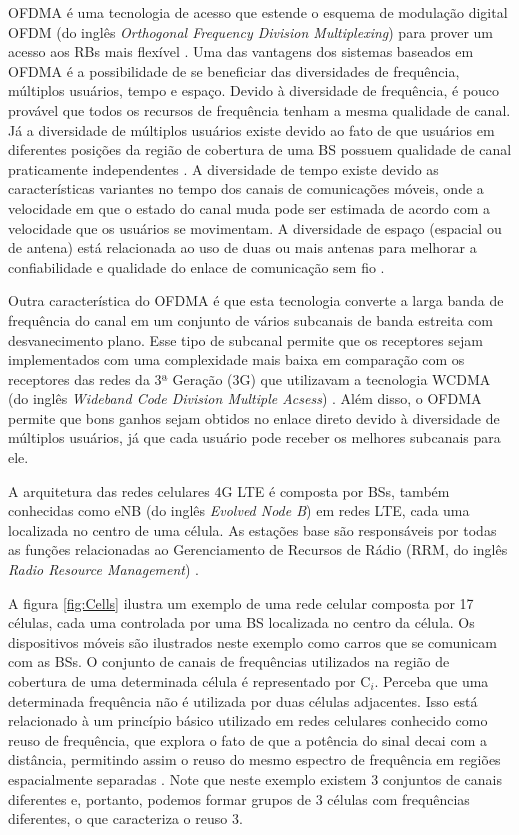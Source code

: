 \acs{OFDMA} é uma tecnologia de acesso que estende o esquema de modulação digital OFDM (do inglês \textit{Orthogonal Frequency Division Multiplexing}) para prover um acesso aos RBs mais flexível \cite{Nasralla2013}. Uma das vantagens dos sistemas baseados em \acs{OFDMA} é a possibilidade de se beneficiar das diversidades de frequência, múltiplos usuários, tempo e espaço. Devido à diversidade de frequência, é pouco provável que todos os recursos de frequência tenham a mesma qualidade de canal. Já a diversidade de múltiplos usuários existe devido ao fato de que usuários em diferentes posições da região de cobertura de uma BS possuem qualidade de canal praticamente independentes \cite{Lima2010}. A diversidade de tempo existe devido as características variantes no tempo dos canais de comunicações móveis, onde a velocidade em que o estado do canal muda pode ser estimada de acordo com a velocidade que os usuários se movimentam. A diversidade de espaço (espacial ou de antena) está relacionada ao uso de duas ou mais antenas para melhorar a confiabilidade e qualidade do enlace de comunicação sem fio \cite{Phd:Emanuel2011}.

Outra característica do \acs{OFDMA} é que esta tecnologia converte a larga banda de frequência do canal em um conjunto de vários subcanais de banda estreita com desvanecimento plano. Esse tipo de subcanal permite que os receptores sejam implementados com uma complexidade mais baixa em comparação com os receptores das redes da 3ª Geração (3G) que utilizavam a tecnologia WCDMA (do inglês \textit{Wideband Code Division Multiple Acsess}) \cite{EUSIPCO2009}. Além disso, o \acs{OFDMA} permite que bons ganhos sejam obtidos no enlace direto devido à diversidade de múltiplos usuários, já que cada usuário pode receber os melhores subcanais para ele.

A arquitetura das redes celulares 4G LTE é composta por BSs, também conhecidas como eNB (do inglês \textit{Evolved Node B}) em redes LTE, cada uma localizada no centro de uma célula. As estações base são responsáveis por todas as funções relacionadas ao Gerenciamento de Recursos de Rádio (RRM, do inglês \textit{Radio Resource Management}) \cite{basukala2009performance}.

A figura \ref{fig:Cells} ilustra um exemplo de uma rede celular composta por 17 células, cada uma controlada por uma BS localizada no centro da célula. Os dispositivos móveis são ilustrados  neste exemplo como carros que se comunicam com as BSs. O conjunto de canais de frequências utilizados na região de cobertura de uma determinada célula é representado por $\text{C}_i$. Perceba que uma determinada frequência não é utilizada por duas células adjacentes. Isso está relacionado à um princípio básico utilizado em redes celulares conhecido como reuso de frequência, que explora o fato de que a potência do sinal decai com a distância, permitindo assim o reuso do mesmo espectro de frequência em regiões espacialmente separadas \cite{goldsmith2005wireless}. Note que neste exemplo existem 3 conjuntos de canais diferentes e, portanto, podemos formar grupos de 3 células com frequências diferentes, o que caracteriza o reuso 3. 

